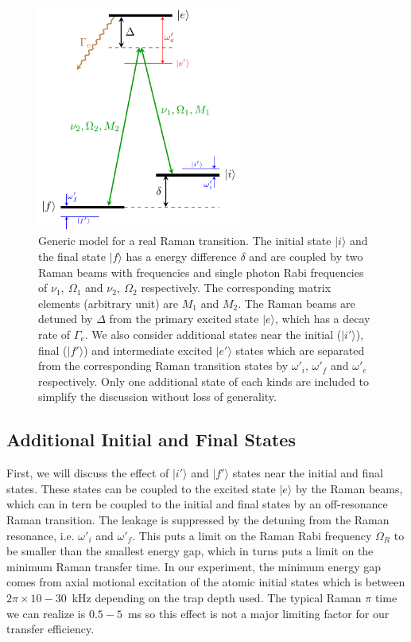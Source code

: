 \begin{figure}
  \centering
  \includegraphics[width=0.6\textwidth]{figures/raman_transfer_generic_raman_model.pdf}
  \caption[Generic model for a real Raman transition]{
    Generic model for a real Raman transition.
    The initial state $|i\rangle$ and the final state $|f\rangle$
    has a energy difference $\delta$
    and are coupled by two Raman beams with frequencies and
    single photon Rabi frequencies of $\nu_1,\ \Omega_1$ and $\nu_2,\ \Omega_2$ respectively.
    The corresponding matrix elements (arbitrary unit) are $M_1$ and $M_2$.
    The Raman beams are detuned by $\Delta$ from the primary excited state $|e\rangle$,
    which has a decay rate of $\Gamma_e$.
    We also consider additional states near the initial ($|i'\rangle$),
    final ($|f'\rangle$) and intermediate excited $|e'\rangle$ states which are
    separated from the corresponding Raman transition states by $\omega'_i$,
    $\omega'_f$ and $\omega'_e$ respectively.
    Only one additional state of each kinds are included to simplify the discussion
    without loss of generality.
    \label{fig:raman-transfer-generic-raman-model}}
\end{figure}

\subsection{Additional Initial and Final States}

First, we will discuss the effect of $|i'\rangle$ and $|f'\rangle$ states
near the initial and final states.
These states can be coupled to the excited state $|e\rangle$ by the Raman beams,
which can in tern be coupled to the initial and final states
by an off-resonance Raman transition.
The leakage is suppressed by the detuning from the Raman resonance,
i.e. $\omega'_i$ and $\omega'_f$.
This puts a limit on the Raman Rabi frequency $\Omega_R$ to be smaller
than the smallest energy gap, which in turns puts a limit on the minimum Raman transfer time.
In our experiment, the minimum energy gap comes from axial motional excitation of
the atomic initial states which is between $2\pi\times10 - 30$~kHz
depending on the trap depth used.
The typical Raman $\pi$ time we can realize is $0.5 - 5$~ms so this effect
is not a major limiting factor for our transfer efficiency.

